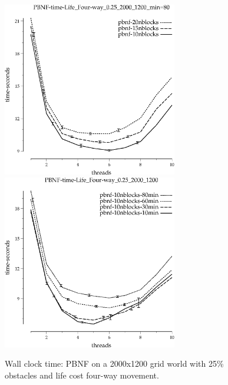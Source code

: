 \documentclass{article}
\begin{document}
\begin{appendices}
\begin{figure}[h]
\begin{center}
\includegraphics[width=3in]{../graphs/grid_life_four-way_0.25_2000_1200/PBNF-time-Life_Four-way_0.25_2000_1200_min=80.eps}
\includegraphics[width=3in]{../graphs/grid_life_four-way_0.25_2000_1200/PBNF-time-Life_Four-way_0.25_2000_1200.eps}
\caption{Wall clock time: PBNF on a 2000x1200 grid world with 25\%
  obstacles and life cost four-way movement.}
\end{center}
\end{figure}


\end{appendices}
\end{document}
